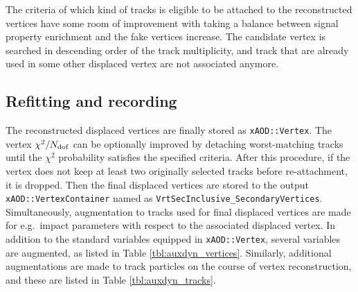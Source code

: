 \documentclass[NOTE, atlasdraft=true, texlive=2018, UKenglish]{\ATLASLATEXPATH atlasdoc}
\begin{document}
The criteria of which kind of tracks is eligible to be attached to the reconstructed vertices have some room of improvement with taking a balance between signal property enrichment and the fake vertices increase. The candidate vertex is searched in descending order of the track multiplicity, and track that are already used in some other displaced vertex are not associated anymore.



\subsection{Refitting and recording}
The reconstructed displaced vertices are finally stored as {\tt xAOD::Vertex}. The vertex $\chi^{2}/N_{\rm dof}$ can be optionally improved by detaching worst-matching tracks until the $\chi^{2}$ probability satisfies the specified criteria. After this procedure, if the vertex does not keep at least two originally selected tracks before re-attachment, it is dropped. Then the final displaced vertices are stored to the output {\tt xAOD::VertexContainer} named as {\tt VrtSecInclusive\_SecondaryVertices}. Simultaneously, augmentation to tracks used for final displaced vertices are made for e.g.~impact parameters with respect to the associated displaced vertex. In addition to the standard variables equipped in {\tt xAOD::Vertex}, several variables are augmented, as listed in Table \ref{tbl:auxdyn_vertices}. Similarly, additional augmentations are made to track particles on the course of vertex reconstruction, and these are listed in Table \ref{tbl:auxdyn_tracks}.
\end{document}
